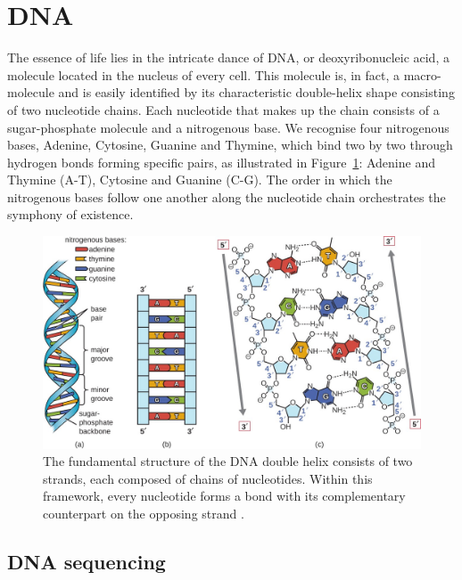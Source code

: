 \section{DNA}
\label{sec:dna}

The essence of life lies in the intricate dance of \acs{DNA}, or deoxyribonucleic acid, a molecule located in the nucleus of every cell. This molecule is, in fact, a macro-molecule and is easily identified by its characteristic double-helix shape consisting of two nucleotide chains. Each nucleotide that makes up the chain consists of a sugar-phosphate molecule and a nitrogenous base. We recognise four nitrogenous bases, Adenine, Cytosine, Guanine and Thymine, which bind two by two through hydrogen bonds forming specific pairs, as illustrated in Figure~\ref{fig:DNA-double-helix-structure}: Adenine and Thymine (A-T), Cytosine and Guanine (C-G). The order in which the nitrogenous bases follow one another along the nucleotide chain orchestrates the symphony of existence.

\begin{figure}[!ht]
	\centering
	\includegraphics[width=0.85\linewidth]{images/dna-structure}
	\caption[The fundamental structure of the \acs{DNA}]{The fundamental structure of the \acs{DNA} double helix consists of two strands, each composed of chains of nucleotides. Within this framework, every nucleotide forms a bond with its complementary counterpart on the opposing strand \cite{openstax2016microbiology}.}
	\label{fig:DNA-double-helix-structure}
\end{figure}




\subsection{DNA sequencing}
\label{subsec:dna-sequencing}

